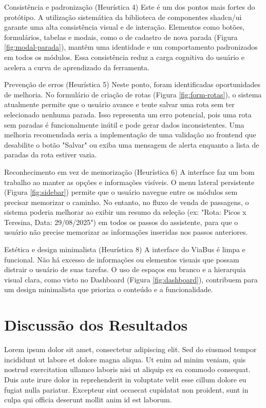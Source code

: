 Consistência e padronização (Heurística 4)
Este é um dos pontos mais fortes do protótipo. A utilização sistemática da biblioteca de componentes shadcn/ui garante uma alta consistência visual e de interação. Elementos como botões, formulários, tabelas e modais, como o de cadastro de nova parada (Figura \ref{fig:modal-parada}), mantêm uma identidade e um comportamento padronizados em todos os módulos. Essa consistência reduz a carga cognitiva do usuário e acelera a curva de aprendizado da ferramenta.

Prevenção de erros (Heurística 5)
Neste ponto, foram identificadas oportunidades de melhoria. No formulário de criação de rotas (Figura \ref{fig:form-rotas}), o sistema atualmente permite que o usuário avance e tente salvar uma rota sem ter selecionado nenhuma parada. Isso representa um erro potencial, pois uma rota sem paradas é funcionalmente inútil e pode gerar dados inconsistentes. Uma melhoria recomendada seria a implementação de uma validação no frontend que desabilite o botão "Salvar" ou exiba uma mensagem de alerta enquanto a lista de paradas da rota estiver vazia.

Reconhecimento em vez de memorização (Heurística 6)
A interface faz um bom trabalho ao manter as opções e informações visíveis. O menu lateral persistente (Figura \ref{fig:sidebar}) permite que o usuário navegue entre os módulos sem precisar memorizar o caminho. No entanto, no fluxo de venda de passagens, o sistema poderia melhorar ao exibir um resumo da seleção (ex: "Rota: Picos x Teresina, Data: 29/08/2025") em todos os passos do assistente, para que o usuário não precise memorizar as informações inseridas nos passos anteriores.

Estética e design minimalista (Heurística 8)
A interface do ViaBus é limpa e funcional. Não há excesso de informações ou elementos visuais que possam distrair o usuário de suas tarefas. O uso de espaços em branco e a hierarquia visual clara, como visto no Dashboard (Figura \ref{fig:dashboard}), contribuem para um design minimalista que prioriza o conteúdo e a funcionalidade.

\section{Discussão dos Resultados}

Lorem ipsum dolor sit amet, consectetur adipiscing elit. Sed do eiusmod tempor incididunt ut labore et dolore magna aliqua. Ut enim ad minim veniam, quis nostrud exercitation ullamco laboris nisi ut aliquip ex ea commodo consequat. Duis aute irure dolor in reprehenderit in voluptate velit esse cillum dolore eu fugiat nulla pariatur. Excepteur sint occaecat cupidatat non proident, sunt in culpa qui officia deserunt mollit anim id est laborum.